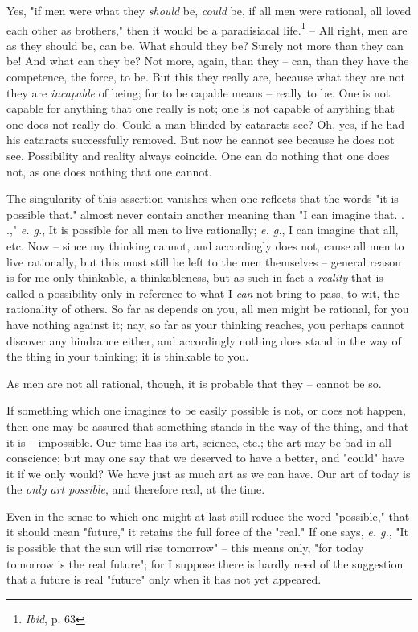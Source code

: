 \documentclass[a4paper]{book}
\begin{document}
Yes, "{}if men were what they \textit{should} be, \textit{could} be, if all 
men were rational, all loved each other as brothers,"{} then it would be a 
paradisiacal life.\footnote{\textit{Ibid}, p. 63} -- All right, men are as 
they should be, can be. What should they be? Surely not more than they can be! 
And what can they be? Not more, again, than they -- can, than they have the 
competence, the force, to be. But this they really are, because what they are 
not they are \textit{incapable} of being; for to be capable means -- really to 
be. One is not capable for anything that one really is not; one is not capable 
of anything that one does not really do. Could a man blinded by cataracts see? 
Oh, yes, if he had his cataracts successfully removed. But now he cannot see 
because he does not see. Possibility and reality always coincide. One can do 
nothing that one does not, as one does nothing that one cannot.

The singularity of this assertion vanishes when one reflects that the words 
"{}it is possible that."{} almost never contain another meaning than "{}I can 
imagine that. . .,"{} \textit{e. g.}, It is possible for all men to live 
rationally; \textit{e. g.}, I can imagine that all, etc. Now -- since my 
thinking cannot, and accordingly does not, cause all men to live rationally, 
but this must still be left to the men themselves -- general reason is for me 
only thinkable, a thinkableness, but as such in fact a \textit{reality} that 
is called a possibility only in reference to what I \textit{can} not bring to 
pass, to wit, the rationality of others. So far as depends on you, all men 
might be rational, for you have nothing against it; nay, so far as your 
thinking reaches, you perhaps cannot discover any hindrance either, and 
accordingly nothing does stand in the way of the thing in your thinking; it is 
thinkable to you.

As men are not all rational, though, it is probable that they -- cannot be so.

If something which one imagines to be easily possible is not, or does not 
happen, then one may be assured that something stands in the way of the thing, 
and that it is -- impossible. Our time has its art, science, etc.; the art may 
be bad in all conscience; but may one say that we deserved to have a better, 
and "{}could"{} have it if we only would? We have just as much art as we can 
have. Our art of today is the \textit{only art possible}, and therefore real, 
at the time.

Even in the sense to which one might at last still reduce the word 
"{}possible,"{} that it should mean "{}future,"{} it retains the full force of 
the "{}real."{} If one says, \textit{e. g.}, "{}It is possible that the sun 
will rise tomorrow"{} -- this means only, "{}for today tomorrow is the real 
future"{}; for I suppose there is hardly need of the suggestion that a future 
is real "{}future"{} only when it has not yet appeared.
\end{document}
